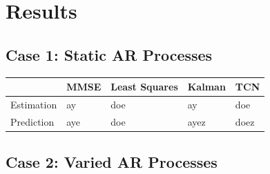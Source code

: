 \documentclass[twocolumn,letterpaper]{IEEEAerospaceCLS}  %
\begin{document}
\section{Results}
\label{sec:results}

\subsection{Case 1: Static AR Processes}

\begin{table}[!h]
\begin{tabular}{|l|l|l|l|l|}
\hline
                            & MMSE                 & Least Squares        & Kalman         & TCN                   \\ \hline
\multirow{3}{*}{Estimation} & \multirow{3}{*}{ay}  & \multirow{3}{*}{doe} & \multirow{3}{*}{ay}   & \multirow{3}{*}{doe}  \\
                            &                      &                      &                       &                       \\
                            &                      &                      &                       &                       \\ \hline
\multirow{3}{*}{Prediction} & \multirow{3}{*}{aye} & \multirow{3}{*}{doe} & \multirow{3}{*}{ayez} & \multirow{3}{*}{doez} \\
                            &                      &                      &                       &                       \\
                            &                      &                      &                       &                       \\ \hline
\end{tabular}
\end{table}

\newpage

\subsection{Case 2: Varied AR Processes}
\end{document}
